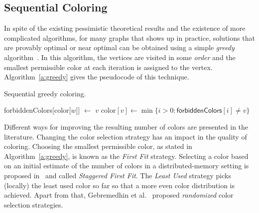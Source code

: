 \documentclass{article}
\begin{document}
\subsection{Sequential Coloring}

In spite of the existing pessimistic theoretical results and the existence of more
complicated algorithms, for many graphs that shows up in practice,
solutions that are provably optimal or near optimal can be obtained
using a simple {\em greedy} algorithm~\cite{CM83}. In this algorithm,
the vertices are visited in some {\em order} and the smallest
permissible color at each iteration is assigned to the vertex. 
Algorithm~\ref{a:greedy} gives the pseudocode of this technique.

\begin{algorithm}
\DontPrintSemicolon
{}

\caption{Sequential greedy coloring.}
\label{a:greedy}

   {
       {
      \textsf{forbiddenColors}[\textsf{color}[$w$]] $\leftarrow$ $v$ \;
}
      \textsf{color}$[v]\leftarrow \min\{i>0: \textsf{forbiddenColors}[i] \neq v\}$ \label{l:assign} \;
}
\end{algorithm}

Different ways for improving the resulting number of colors
are presented in the literature. Changing the color selection strategy
has an impact in the quality of coloring. Choosing the smallest permissible color,
as stated in Algorithm~\ref{a:greedy},
is known as the {\em First Fit} strategy. Selecting a color based
on an initial estimate of the number of colors in a distributed-memory setting
is proposed in~\cite{BGMBC-jpdc} and called {\em Staggered First Fit}.
The {\em Least Used} strategy picks (locally) the least used color so far so that
a more even color distribution is achieved. Apart from that, 
Gebremedhin et al.~\cite{Gebremedhin02paralleldistance-k}
proposed {\em randomized} color selection strategies.
\end{document}
